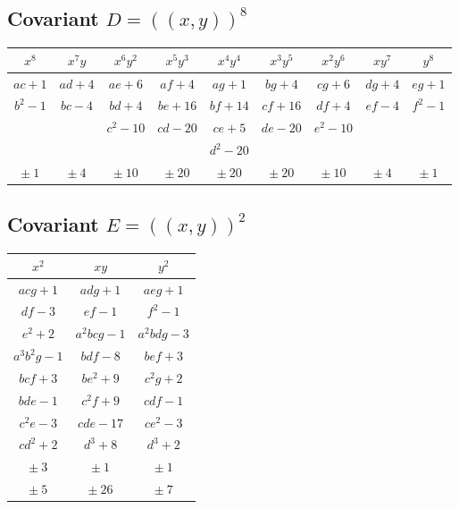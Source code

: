 \documentclass[11pt,a4paper]{book}
\begin{document}
\subsection*{Covariant $D = (\!\!(x,y)\!\!)^{8}$}

\begin{center}
\begin{tabular}{|c|c|c|c|c|c|c|c|c|}
\hline
$x^{8}$ & $x^{7}y$ & $x^{6}y^{2}$ & $x^{5}y^{3}$ & $x^{4}y^{4}$ & $x^{3}y^{5}$ & $x^{2}y^{6}$ & $xy^{7}$ & $y^{8}$ \\
\hline
$ac+1$ & $ad+4$ & $ae+6$ & $af+4$ & $ag+1$ & $bg+4$ & $cg+6$ & $dg+4$ & $eg+1$ \\
$b^{2}-1$ & $bc-4$ & $bd+4$ & $be+16$ & $bf+14$ & $cf+16$ & $df+4$ & $ef-4$ & $f^{2}-1$ \\
 &  & $c^{2}-10$ & $cd-20$ & $ce+5$ & $de-20$ & $e^{2}-10$ &  &  \\
 &  &  &  & $d^{2}-20$ &  &  &  &  \\
\hline
$\pm\ 1$ & $\pm\ 4$ & $\pm\ 10$ & $\pm\ 20$ & $\pm\ 20$ & $\pm\ 20$ & $\pm\ 10$ & $\pm\ 4$ & $\pm\ 1$ \\
\hline
\end{tabular}
\end{center}

\subsection*{Covariant $E = (\!\!(x,y)\!\!)^{2}$}

\begin{center}
\begin{tabular}{|c|c|c|}
\hline
$x^{2}$ & $xy$ & $y^{2}$ \\
\hline
$acg+1$ & $adg+1$ & $aeg+1$ \\
$df-3$ & $ef-1$ & $f^{2}-1$ \\
$e^{2}+2$ & $a^{2}bcg-1$ & $a^{2}bdg-3$ \\
$a^{3}b^{2}g-1$ & $bdf-8$ & $bef+3$ \\
$bcf+3$ & $be^{2}+9$ & $c^{2}g+2$ \\
$bde-1$ & $c^{2}f+9$ & $cdf-1$ \\
$c^{2}e-3$ & $cde-17$ & $ce^{2}-3$ \\
$cd^{2}+2$ & $d^{3}+8$ & $d^{3}+2$ \\
\hline
$\pm\ 3$ & $\pm\ 1$ & $\pm\ 1$ \\
$\pm\ 5$ & $\pm\ 26$ & $\pm\ 7$ \\
\hline
\end{tabular}
\end{center}
\end{document}
